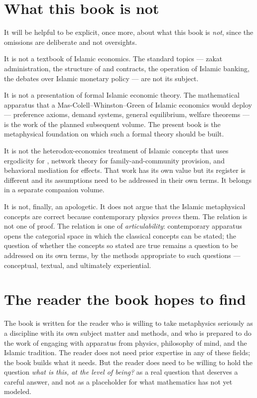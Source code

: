 \section{What this book is not}
\label{sec:not}

It will be helpful to be explicit, once more, about what this book is
\emph{not}, since the omissions are deliberate and not oversights.

It is not a textbook of Islamic economics. The standard topics ---
zakat administration, the structure of  and
 contracts, the operation of Islamic banking, the
debates over Islamic monetary policy --- are not its subject.

It is not a presentation of formal Islamic economic theory. The
mathematical apparatus that a Mas-Colell--Whinston--Green of Islamic
economics would deploy --- preference axioms, demand systems, general
equilibrium, welfare theorems --- is the work of the planned subsequent
volume. The present book is the metaphysical foundation on which such
a formal theory should be built.

It is not the heterodox-economics treatment of Islamic concepts that
uses ergodicity for , network theory for family-and-community
provision, and behavioral mediation for  effects. That
work has its own value but its register is different and its
assumptions need to be addressed in their own terms. It belongs in a
separate companion volume.

It is not, finally, an apologetic. It does not argue that the Islamic
metaphysical concepts are correct because contemporary physics
\emph{proves} them. The relation is not one of proof. The relation is
one of \emph{articulability}: contemporary apparatus opens the
categorial space in which the classical concepts can be stated; the
question of whether the concepts so stated are true remains a question
to be addressed on its own terms, by the methods appropriate to such
questions --- conceptual, textual, and ultimately experiential.

\section{The reader the book hopes to find}

The book is written for the reader who is willing to take metaphysics
seriously as a discipline with its own subject matter and methods, and
who is prepared to do the work of engaging with apparatus from physics,
philosophy of mind, and the Islamic tradition. The reader does not need
prior expertise in any of these fields; the book builds what it needs.
But the reader does need to be willing to hold the question
\emph{what is this, at the level of being?} as a real question that
deserves a careful answer, and not as a placeholder for what
mathematics has not yet modeled.

